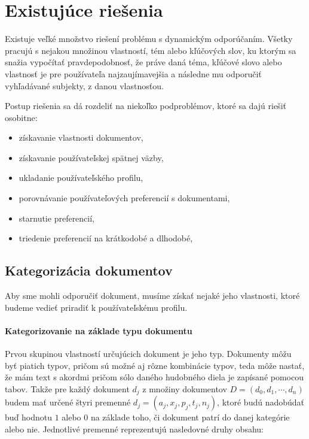 \newpage


\section{Existujúce riešenia}

Existuje veľké množstvo riešení problému s dynamickým odporúčaním. Všetky pracujú s nejakou množinou vlastností, tém alebo kľúčových slov, ku ktorým sa snažia vypočítať pravdepodobnosť, že práve daná téma, kľúčové slovo alebo vlastnosť je pre používateľa najzaujímavejšia a následne mu odporučiť vyhľadávané subjekty, z danou vlastnosťou.

Postup riešenia sa dá rozdeliť na niekoľko podproblémov, ktoré sa dajú riešiť osobitne:

\begin{itemize}
\item{získavanie vlastnosti dokumentov,}
\item{získavanie používateľskej spätnej väzby,}
\item{ukladanie používateľského profilu,}
\item{porovnávanie používateľových preferencií s dokumentami,}
\item{starnutie preferencií,}
\item{triedenie preferencií na krátkodobé a dlhodobé,}
\end{itemize}

\subsection{Kategorizácia dokumentov}

Aby sme mohli odporučiť dokument, musíme získať nejaké jeho vlastnosti, ktoré budeme vedieť priradiť k používateľskému profilu. 

\paragraph{Kategorizovanie na základe typu dokumentu}

Prvou skupinou vlastností určujúcich dokument je jeho typ. Dokumenty môžu byť piatich typov, pričom sú možné aj rôzne kombinácie typov, teda môže nastať, že mám text s akordmi pričom sólo daného hudobného diela je zapísané pomocou tabov. Takže pre každý dokument \(d_j\) z množiny dokumentov \(D = (d_0, d_1, \cdots, d_n)\) budem mať určené štyri premenné \(d_j = (a_j, x_j, p_j, t_j, n_j)\), ktoré budú nadobúdať buď hodnotu \(1\) alebo \(0\) na základe toho, či dokument patrí do danej kategórie alebo nie. Jednotlivé premenné reprezentujú nasledovné druhy obsahu:

